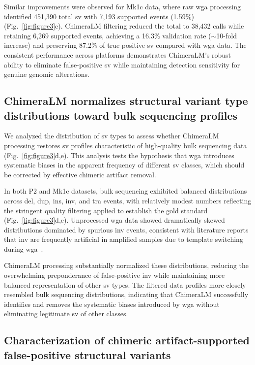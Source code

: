 \documentclass[pdflatex,sn-nature]{sn-jnl}%
\theoremstyle{thmstyleone}%
\theoremstyle{thmstyletwo}%
\theoremstyle{thmstylethree}%
\begin{document}
Similar improvements were observed for Mk1c data, where raw \gls{wga} processing identified 451,390 total \gls{sv} with 7,193 supported events (1.59\%) (Fig.~\ref{fig:figure3}c).
ChimeraLM filtering reduced the total to 38,432 calls while retaining 6,269 supported events, achieving a 16.3\% validation rate ($\sim$10-fold increase) and preserving 87.2\% of true positive \gls{sv} compared with \gls{wga} data.
The consistent performance across platforms demonstrates ChimeraLM's robust ability to eliminate false-positive \gls{sv} while maintaining detection sensitivity for genuine genomic alterations.

\subsection*{ChimeraLM normalizes structural variant type distributions toward bulk sequencing profiles}

We analyzed the distribution of \gls{sv} types to assess whether ChimeraLM processing restores \gls{sv} profiles characteristic of high-quality bulk sequencing data (Fig.~\ref{fig:figure3}d,e).
This analysis tests the hypothesis that \gls{wga} introduces systematic biases in the apparent frequency of different \gls{sv} classes, which should be corrected by effective chimeric artifact removal.

In both P2 and Mk1c datasets, bulk sequencing exhibited balanced distributions across \gls{del}, \gls{dup}, \gls{ins}, \gls{inv}, and \gls{tra} events, with relatively modest numbers reflecting the stringent quality filtering applied to establish the gold standard (Fig.~\ref{fig:figure3}d,e).
Unprocessed \gls{wga} data showed dramatically skewed distributions dominated by spurious \gls{inv} events, consistent with literature reports that \gls{inv} are frequently artificial in amplified samples due to template switching during \gls{wga}~\cite{lu2023exploration, lu2023chimera}.

ChimeraLM processing substantially normalized these distributions, reducing the overwhelming preponderance of false-positive \gls{inv} while maintaining more balanced representation of other \gls{sv} types.
The filtered data profiles more closely resembled bulk sequencing distributions, indicating that ChimeraLM successfully identifies and removes the systematic biases introduced by \gls{wga} without eliminating legitimate \gls{sv} of other classes.

\subsection*{Characterization of chimeric artifact-supported false-positive structural variants}
\end{document}
